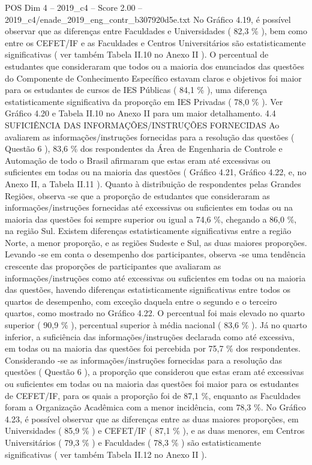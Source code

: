 \begin{textsample}{POS Dim 4 – 2019\_c4 – Score 2.00 – 2019\_c4/enade\_2019\_eng\_contr\_b307920d5e.txt}
No Gráfico 4.19, é possível observar que as diferenças entre Faculdades e Universidades ( 82,3 \% ), bem como entre os CEFET/IF e as Faculdades e Centros Universitários são estatisticamente significativas ( ver também Tabela II.10 no Anexo II ).
O percentual de estudantes que consideraram que todos ou a maioria dos enunciados das questões do Componente de Conhecimento Específico estavam claros e objetivos foi maior para os estudantes de cursos de IES Públicas ( 84,1 \% ), uma diferença estatisticamente significativa da proporção em IES Privadas ( 78,0 \% ).
Ver Gráfico 4.20 e Tabela II.10 no Anexo II para um maior detalhamento. 4.4 SUFICIÊNCIA DAS INFORMAÇÕES/INSTRUÇÕES FORNECIDAS Ao avaliarem as informações/instruções fornecidas para a resolução das questões ( Questão 6 ), 83,6 \% dos respondentes da Área de Engenharia de Controle e Automação de todo o Brasil afirmaram que estas eram até excessivas ou suficientes em todas ou na maioria das questões ( Gráfico 4.21, Gráfico 4.22, e, no Anexo II, a Tabela II.11 ).
Quanto à distribuição de respondentes pelas Grandes Regiões, observa -se que a proporção de estudantes que consideraram as informações/instruções fornecidas até excessivas ou suficientes em todas ou na maioria das questões foi sempre superior ou igual a 74,6 \%, chegando a 86,0 \%, na região Sul.
Existem diferenças estatisticamente significativas entre a região Norte, a menor proporção, e as regiões Sudeste e Sul, as duas maiores proporções.
Levando -se em conta o desempenho dos participantes, observa -se uma tendência crescente das proporções de participantes que avaliaram as informações/instruções como até excessivas ou suficientes em todas ou na maioria das questões, havendo diferenças estatisticamente significativas entre todos os quartos de desempenho, com exceção daquela entre o segundo e o terceiro quartos, como mostrado no Gráfico 4.22.
O percentual foi mais elevado no quarto superior ( 90,9 \% ), percentual superior à média nacional ( 83,6 \% ).
Já no quarto inferior, a suficiência das informações/instruções declarada como até excessiva, em todas ou na maioria das questões foi percebida por 75,7 \% dos respondentes.
Considerando -se as informações/instruções fornecidas para a resolução das questões ( Questão 6 ), a proporção que considerou que estas eram até excessivas ou suficientes em todas ou na maioria das questões foi maior para os estudantes de CEFET/IF, para os quais a proporção foi de 87,1 \%, enquanto as Faculdades foram a Organização Acadêmica com a menor incidência, com 78,3 \%.
No Gráfico 4.23, é possível observar que as diferenças entre as duas maiores proporções, em Universidades ( 85,9 \% ) e CEFET/IF ( 87,1 \% ), e as duas menores, em Centros Universitários ( 79,3 \% ) e Faculdades ( 78,3 \% ) são estatisticamente significativas ( ver também Tabela II.12 no Anexo II ).

\end{textsample}
